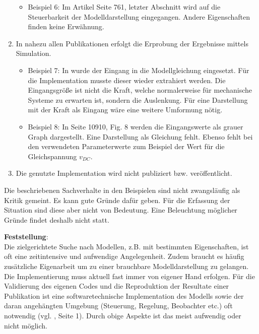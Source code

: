 \begin{enumerate}
	\begin{itemize}[label=$\bullet$]
		\item Beispiel 6: Im Artikel \cite{PEGUEA16} Seite 761, letzter Abschnitt wird auf die Steuerbarkeit der Modelldarstellung eingegangen. Andere Eigenschaften finden keine Erwähnung.
	\end{itemize}
	\item In nahezu allen Publikationen erfolgt die Erprobung der Ergebnisse mittels Simulation. 
	\begin{itemize}[label=$\bullet$]
		\item Beispiel 7: In \cite{BUT21} wurde der Eingang in die Modellgleichung eingesetzt. Für die Implementation musste dieser wieder extrahiert werden. Die Eingangsgröße ist nicht die Kraft, welche normalerweise für mechanische Systeme zu erwarten ist, sondern die Auslenkung. Für eine Darstellung mit der Kraft als Eingang wäre eine weitere Umformung nötig.
		\item Beispiel 8: In \cite{FEGE18} Seite 10910, Fig. 8 werden die Eingangswerte als grauer Graph dargestellt. Eine Darstellung als Gleichung fehlt. Ebenso fehlt bei den verwendeten Parameterwerte zum Beispiel der Wert für die Gleichspannung $v_{DC}$.
	\end{itemize}
	\item Die genutzte Implementation wird nicht publiziert bzw. veröffentlicht.
\end{enumerate}
Die beschriebenen Sachverhalte in den Beispielen sind nicht zwangsläufig als Kritik gemeint. Es kann gute Gründe dafür geben. Für die Erfassung der Situation sind diese aber nicht von Bedeutung. Eine Beleuchtung möglicher Gründe findet deshalb nicht statt.

\textbf{Feststellung}:\\
Die zielgerichtete Suche nach Modellen, z.B. mit bestimmten Eigenschaften, ist oft eine zeitintensive und aufwendige Angelegenheit. Zudem braucht es häufig zusätzliche Eigenarbeit um zu einer brauchbare Modelldarstellung zu gelangen. Die Implementierung muss aktuell fast immer von eigener Hand erfolgen. Für die Validierung des eigenen Codes und die Reproduktion der Resultate einer Publikation ist eine softwaretechnische Implementation des Modells sowie der daran angehängten Umgebung (Steuerung, Regelung, Beobachter etc.) oft notwendig (vgl. \cite{KNHE20b}, Seite 1). Durch obige Aspekte ist das meist aufwendig oder nicht möglich.

